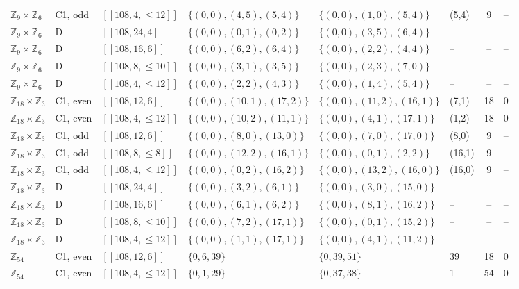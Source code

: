\documentclass[reprint,twocolumn,superscriptaddress,nofootinbib]{revtex4-2}
\theoremstyle{plain}
\begin{document}
\begin{table}[!t]
\begin{ruledtabular}
\begin{tabular}{llllllcc}
$\mathbb{Z}_{9}\times\mathbb{Z}_{6}$ & C1, odd & $[[108,4,\le12]]$ & $\{(0,0),(4,5),(5,4)\}$ & $\{(0,0),(1,0),(5,4)\}$ & (5,4) & 9 & -- \\
$\mathbb{Z}_{9}\times\mathbb{Z}_{6}$ & D & $[[108,24,4]]$ & $\{(0,0),(0,1),(0,2)\}$ & $\{(0,0),(3,5),(6,4)\}$ & -- & -- & -- \\
$\mathbb{Z}_{9}\times\mathbb{Z}_{6}$ & D & $[[108,16,6]]$ & $\{(0,0),(6,2),(6,4)\}$ & $\{(0,0),(2,2),(4,4)\}$ & -- & -- & -- \\
$\mathbb{Z}_{9}\times\mathbb{Z}_{6}$ & D & $[[108,8,\le10]]$ & $\{(0,0),(3,1),(3,5)\}$ & $\{(0,0),(2,3),(7,0)\}$ & -- & -- & -- \\
$\mathbb{Z}_{9}\times\mathbb{Z}_{6}$ & D & $[[108,4,\le12]]$ & $\{(0,0),(2,2),(4,3)\}$ & $\{(0,0),(1,4),(5,4)\}$ & -- & -- & -- \\
$\mathbb{Z}_{18}\times\mathbb{Z}_{3}$ & C1, even & $[[108,12,6]]$ & $\{(0,0),(10,1),(17,2)\}$ & $\{(0,0),(11,2),(16,1)\}$ & (7,1) & 18 & 0 \\
$\mathbb{Z}_{18}\times\mathbb{Z}_{3}$ & C1, even & $[[108,4,\le12]]$ & $\{(0,0),(10,2),(11,1)\}$ & $\{(0,0),(4,1),(17,1)\}$ & (1,2) & 18 & 0 \\
$\mathbb{Z}_{18}\times\mathbb{Z}_{3}$ & C1, odd & $[[108,12,6]]$ & $\{(0,0),(8,0),(13,0)\}$ & $\{(0,0),(7,0),(17,0)\}$ & (8,0) & 9 & -- \\
$\mathbb{Z}_{18}\times\mathbb{Z}_{3}$ & C1, odd & $[[108,8,\le8]]$ & $\{(0,0),(12,2),(16,1)\}$ & $\{(0,0),(0,1),(2,2)\}$ & (16,1) & 9 & -- \\
$\mathbb{Z}_{18}\times\mathbb{Z}_{3}$ & C1, odd & $[[108,4,\le12]]$ & $\{(0,0),(0,2),(16,2)\}$ & $\{(0,0),(13,2),(16,0)\}$ & (16,0) & 9 & -- \\
$\mathbb{Z}_{18}\times\mathbb{Z}_{3}$ & D & $[[108,24,4]]$ & $\{(0,0),(3,2),(6,1)\}$ & $\{(0,0),(3,0),(15,0)\}$ & -- & -- & -- \\
$\mathbb{Z}_{18}\times\mathbb{Z}_{3}$ & D & $[[108,16,6]]$ & $\{(0,0),(6,1),(6,2)\}$ & $\{(0,0),(8,1),(16,2)\}$ & -- & -- & -- \\
$\mathbb{Z}_{18}\times\mathbb{Z}_{3}$ & D & $[[108,8,\le10]]$ & $\{(0,0),(7,2),(17,1)\}$ & $\{(0,0),(0,1),(15,2)\}$ & -- & -- & -- \\
$\mathbb{Z}_{18}\times\mathbb{Z}_{3}$ & D & $[[108,4,\le12]]$ & $\{(0,0),(1,1),(17,1)\}$ & $\{(0,0),(4,1),(11,2)\}$ & -- & -- & -- \\
$\mathbb{Z}_{54}$ & C1, even & $[[108,12,6]]$ & $\{0,6,39\}$ & $\{0,39,51\}$ & 39 & 18 & 0 \\
$\mathbb{Z}_{54}$ & C1, even & $[[108,4,\le12]]$ & $\{0,1,29\}$ & $\{0,37,38\}$ & 1 & 54 & 0 \\

\end{tabular}
\end{ruledtabular}
\end{table}
\end{document}
